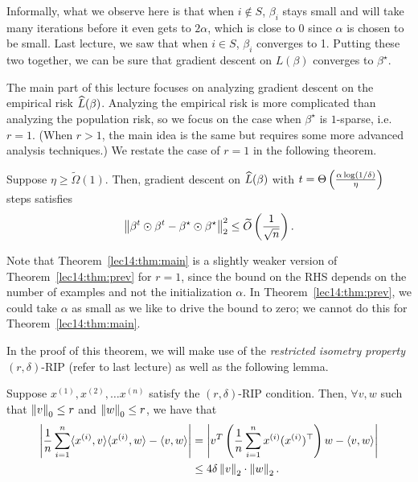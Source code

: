 Informally, what we observe here is that when $i \notin S$, $\beta_{i}$ stays small and will take many iterations before it even gets to $2\alpha$, which is close to $0$ since $\alpha$ is chosen to be small. Last lecture, we saw that when $i\in S$, $\beta_i$ converges to 1. Putting these two together, we can be sure that gradient descent on $L(\beta)$ converges to $\beta^\star.$


The main part of this lecture focuses on analyzing gradient descent on the empirical risk $\widehat{L}(\beta)$. Analyzing the empirical risk is more complicated than analyzing the population risk, so we focus on the case when $\beta^\star$ is $1$-sparse, i.e. $r=1$. (When $r>1$, the main idea is the same but requires some more advanced analysis techniques.) We restate the case of $r=1$ in the following theorem.
 
\begin{theorem} \label{lec14:thm:main}
Suppose $\eta \geq \widetilde{\Omega}(1).$ Then, gradient descent on $\widehat{L}(\beta)$ with $t = \Theta \left(\frac{\alpha \log (1/\delta)}{\eta}\right)$ steps satisfies 
\begin{equation}
\left\|\beta^{t} \odot \beta^{t} - \beta^\star \odot \beta^\star\right\|_{2}^{2} \leq \widetilde{O}\left(\frac{1}{\sqrt{n}}\right).
\end{equation} 
\end{theorem}

\begin{remark}
Note that Theorem~\ref{lec14:thm:main} is a slightly weaker version of Theorem~\ref{lec14:thm:prev} for $r=1$, since the bound on the RHS depends on the number of examples and not the initialization $\alpha$. In Theorem~\ref{lec14:thm:prev}, we could take $\alpha$ as small as we like to drive the bound to zero; we cannot do this for Theorem~\ref{lec14:thm:main}.
\end{remark}

In the proof of this theorem, we will make use of the \textit{restricted isometry property} $(r, \delta)$-RIP (refer to last lecture) as well as the following lemma.

\begin{lemma}\label{lec14:lem:rip}
    Suppose $x^{(1)}, x^{(2)}, \dots x^{(n)}$ satisfy the $(r, \delta)$-RIP condition. Then, $\forall v, w$ such that $\left\|v\right\|_{0} \leq r$ and $\left\|w\right\|_{0} \leq r$, we have that
    \begin{align}
        \left| \frac{1}{n} \sum_{i=1}^{n} \langle x^{(i)}, v \rangle \langle x^{(i)}, w \rangle  - \langle v, w \rangle \right| &= \left|  v^{T} \left(\frac{1}{n} \sum_{i=1}^{n}  x^{(i)} (x^{(i)})^\top \right)  w  - \langle v, w \rangle \right| \\
        &\leq 4 \delta \left\|v\right\|_{2} \cdot \left\|w\right\|_{2}.
    \end{align} 
\end{lemma}

